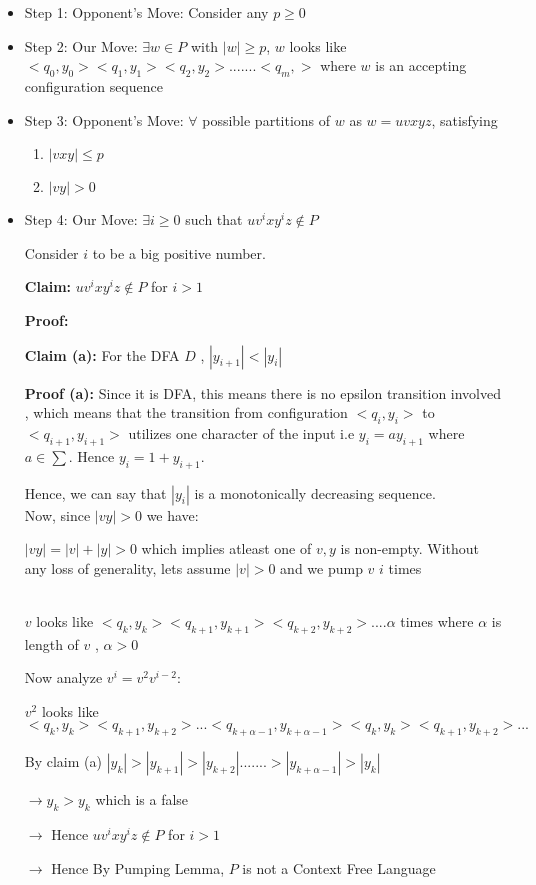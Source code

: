 \documentclass[12pt,a4paper]{article}
\begin{document}
\begin{itemize}
    \item Step 1: Opponent's Move: Consider any $ p \geq 0$
    \item Step 2: Our Move: $\exists w \in P$ with $|w| \geq p$,
    $w$ looks like $<q_0,y_0><q_1,y_1><q_2,y_2>.......<q_m,>$ where $w$ is an accepting configuration sequence
    \item Step 3: Opponent's Move: $\forall$ possible partitions of $w$ as $w=uvxyz$, satisfying 
    \begin{enumerate}
        \item $|vxy| \leq p$
        \item $|vy| > 0$
    \end{enumerate}
    \item Step 4: Our Move: $\exists i \geq 0$  such that $uv^ixy^iz \notin P$
    
    
    Consider $i$ to be a big positive number. 
    
    
    \textbf{Claim:} $uv^ixy^iz \notin P$ for $i > 1$
    
    \textbf{Proof:}
    
    \textbf{Claim (a):} For the DFA $D$ , $|y_{i+1}| < |y_i|$
    
    
    \textbf{Proof (a):} Since it is DFA, this means there is no epsilon transition involved , which means that the transition from configuration $<q_i,y_i>$ to $<q_{i+1},y_{i+1}>$ utilizes one character of the input i.e $y_i=ay_{i+1}$ where $a \in \sum$. Hence $y_i = 1+y_{i+1}$. 
    
    Hence, we can say that $|y_i|$ is a monotonically decreasing sequence.
    \\
    Now, since $|vy| > 0$ we have:
    
    $|vy|=|v|+|y| >0$
    which implies atleast one of $v,y$ is non-empty. Without any loss of generality, lets assume $|v| >0$ and we pump $v $ $i$ times 
    
    \\
    $v$ looks like $<q_k,y_k><q_{k+1},y_{k+1}><q_{k+2},y_{k+2}>....\alpha$ times where $\alpha$ is length of $v$ , $\alpha > 0$
    
    Now analyze $v^i = v^2v^{i-2}$:
    
    $v^2$ looks like $<q_k,y_k><q_{k+1},y_{k+2}>...<q_{k+\alpha-1},y_{k+\alpha-1}><q_k,y_k><q_{k+1},y_{k+2}>...$
    
    By claim (a) $|y_k| > |y_{k+1}| > |y_{k+2}|.......>|y_{k+\alpha -1}| > |y_k|$
    
    $\rightarrow y_k >y_k $
    which is a false
    
    $\rightarrow$ Hence $uv^ixy^iz \notin P$ for $i > 1$
    
    $\rightarrow$ Hence By Pumping Lemma, $P$ is not a Context Free Language

    
    
    
\end{itemize} 
\end{document}
